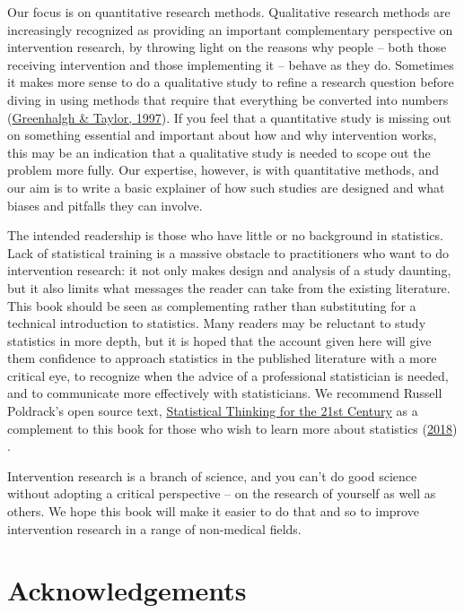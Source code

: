 \documentclass{krantz}
\begin{document}
Our focus is on quantitative research methods. Qualitative research methods are increasingly recognized as providing an important complementary perspective on intervention research, by throwing light on the reasons why people -- both those receiving intervention and those implementing it -- behave as they do. Sometimes it makes more sense to do a qualitative study to refine a research question before diving in using methods that require that everything be converted into numbers (\protect\hyperlink{ref-greenhalgh1997}{Greenhalgh \& Taylor, 1997}). If you feel that a quantitative study is missing out on something essential and important about how and why intervention works, this may be an indication that a qualitative study is needed to scope out the problem more fully. Our expertise, however, is with quantitative methods, and our aim is to write a basic explainer of how such studies are designed and what biases and pitfalls they can involve.

The intended readership is those who have little or no background in statistics. Lack of statistical training is a massive obstacle to practitioners who want to do intervention research: it not only makes design and analysis of a study daunting, but it also limits what messages the reader can take from the existing literature. This book should be seen as complementing rather than substituting for a technical introduction to statistics. Many readers may be reluctant to study statistics in more depth, but it is hoped that the account given here will give them confidence to approach statistics in the published literature with a more critical eye, to recognize when the advice of a professional statistician is needed, and to communicate more effectively with statisticians. We recommend Russell Poldrack's open source text, \href{
}{Statistical Thinking for the 21st Century} as a complement to this book for those who wish to learn more about statistics (\protect\hyperlink{ref-poldrack2018}{2018}) .

Intervention research is a branch of science, and you can't do good science without adopting a critical perspective  -- on the research of yourself as well as others. We hope this book will make it easier to do that and so to improve intervention research in a range of non-medical fields.

\hypertarget{acknowledgements}{%
\section*{Acknowledgements}\label{acknowledgements}}
\end{document}
